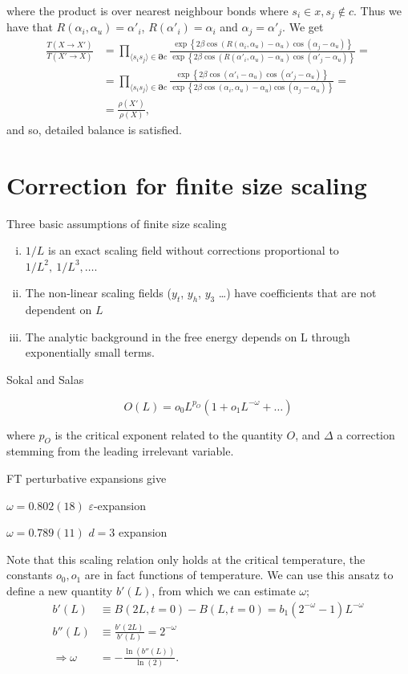 where the product is over nearest neighbour bonds where $s_i \in x, s_j \notin c$.
Thus we have that $ R(\alpha_i,\alpha_u) = \alpha'_i $, $R(\alpha'_i) = \alpha_i$ and $\alpha_j = \alpha'_j$.
We get
\begin{align}
  \frac{T(X\rightarrow X')}{T(X'\rightarrow X)}&= \prod_{\langle s_i s_j \rangle \in \bm{\partial} c} \frac{ \exp\left\{2\beta\cos(R(\alpha_i,\alpha_u) - \alpha_u)\cos(\alpha_j - \alpha_u)\right\}}{ \exp\left\{2\beta\cos(R(\alpha'_i,\alpha_u) - \alpha_u)\cos(\alpha'_j -\alpha_u)\right\}} = \\
  &= \prod_{\langle s_i s_j \rangle \in \bm{\partial} c} \frac{ \exp\left\{2\beta\cos(\alpha'_i - \alpha_u)\cos(\alpha'_j - \alpha_u)\right\}}{ \exp\left\{2\beta\cos(\alpha_i,\alpha_u) - \alpha_u)\cos(\alpha_j -\alpha_u)\right\}} = \\
  &= \frac{\rho(X')}{\rho(X)},
\end{align}
and so, detailed balance is satisfied.

\section{Correction for finite size scaling}
Three basic assumptions of finite size scaling
\begin{enumerate}[(i)]
  \item $1/L$ is an exact scaling field without corrections proportional to $1/L^2,~1/L^3, \dots$.
  \item The non-linear scaling fields ($y_t$, $y_h$, $y_3$ \dots) have coefficients that are not dependent on $L$
  \item The analytic background in the free energy depends on L through exponentially small terms.


\end{enumerate}
Sokal and Salas

\begin{equation}
  O(L)= o_0 L^{p_O}(1 + o_1 L^{-\omega} + \dots)
  \label{}
\end{equation}

where $p_O$ is the critical exponent related to the quantity $O$, and $\Delta$ a correction stemming from the leading irrelevant variable.

FT perturbative expansions give 

$\omega = 0.802(18)$ $ \varepsilon$-expansion

$\omega = 0.789(11)$ $ d=3$ expansion

Note that this scaling relation only holds at the critical temperature, the constants $o_0, o_1$ are in fact functions of temperature. 
We can use this ansatz to define a new quantity $b'(L)$, from which we can estimate $\omega$;
\begin{align}
  b'(L) &\equiv B(2L,t=0) - B(L,t=0) = b_1(2^{-\omega} -1)L^{-\omega}\\
  b''(L)&\equiv \frac{b'(2L)}{b'(L)} = 2^{-\omega}\\
  \Rightarrow \omega &= -\frac{\ln(b''(L))}{\ln(2)}.\label{three_l_omega}
\end{align}

